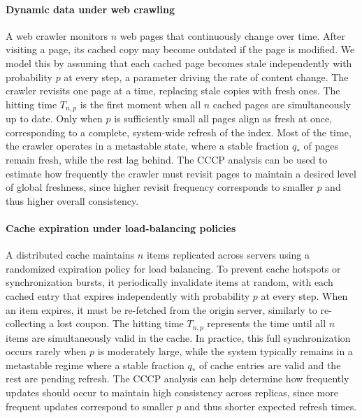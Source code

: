 \documentclass[11pt,a4paper]{article}
\begin{document}
\paragraph*{Dynamic data under web crawling}
A web crawler monitors $n$ web pages that continuously change over time.
After visiting a page, its cached copy may become outdated if the page is modified.
We model this by assuming that each cached page becomes stale independently with probability $p$ at every step, a parameter driving the rate of content change.
The crawler revisits one page at a time, replacing stale copies with fresh ones.
The hitting time $T_{n,p}$ is the first moment when all $n$ cached pages are simultaneously up to date.
Only when $p$ is sufficiently small all pages align as fresh at once, corresponding to a complete, system-wide refresh of the index.
Most of the time, the crawler operates in a metastable state, where a stable fraction $q_*$ of pages remain fresh, while the rest lag behind.
The CCCP analysis can be used to estimate how frequently the crawler must revisit pages to maintain a desired level of global freshness, since higher revisit frequency corresponds to smaller $p$ and thus higher overall consistency.

\paragraph*{Cache expiration under load-balancing policies}
A distributed cache maintains $n$ items replicated across servers using a randomized expiration policy for load balancing.
To prevent cache hotspots or synchronization bursts, it periodically invalidate items at random, with each cached entry that expires independently with probability $p$ at every step.
When an item expires, it must be re-fetched from the origin server, similarly to re-collecting a lost coupon.
The hitting time $T_{n,p}$ represents the time until all $n$ items are simultaneously valid in the cache.
In practice, this full synchronization occurs rarely when $p$ is moderately large, while the system typically remains in a metastable regime where a stable fraction $q_*$ of cache entries are valid and the rest are pending refresh.
The CCCP analysis can help determine how frequently updates should occur to maintain high consistency across replicas, since more frequent updates correspond to smaller $p$ and thus shorter expected refresh times.
\end{document}
